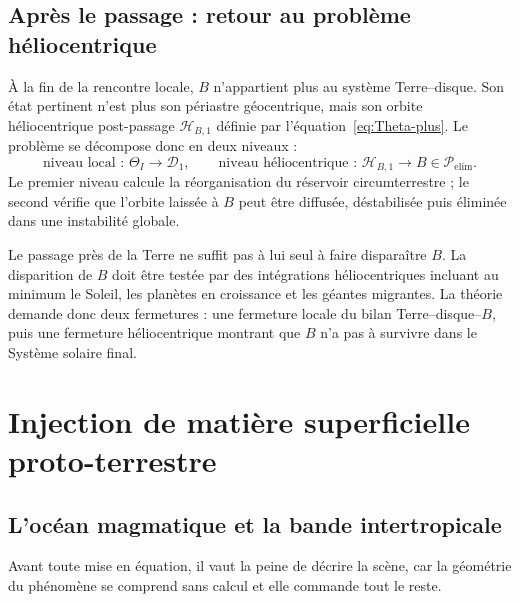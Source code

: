 \documentclass[11pt,a4paper,openany]{report}
\begin{document}
\section{Après le passage : retour au problème héliocentrique}
\label{sec:retour-heliocentrique}

À la fin de la rencontre locale, $B$ n'appartient plus au système Terre--disque. Son état pertinent
n'est plus son périastre géocentrique, mais son orbite héliocentrique post-passage
$\mathcal{H}_{B,1}$ définie par l'équation~\eqref{eq:Theta-plus}. Le problème se décompose donc en
deux niveaux :
\begin{equation}
\boxed{\;\text{niveau local : } \Theta_I\to\mathcal{D}_1,
\qquad
\text{niveau héliocentrique : } \mathcal{H}_{B,1}\to B\in\mathcal{P}_{\mathrm{elim}}.\;}
\label{eq:deux-niveaux-B}
\end{equation}
Le premier niveau calcule la réorganisation du réservoir circumterrestre ; le second vérifie que
l'orbite laissée à $B$ peut être diffusée, déstabilisée puis éliminée dans une instabilité globale.

\begin{controle}
Le passage près de la Terre ne suffit pas à lui seul à faire disparaître $B$. La disparition de $B$
doit être testée par des intégrations héliocentriques incluant au minimum le Soleil, les planètes en
croissance et les géantes migrantes. La théorie demande donc deux fermetures : une fermeture
locale du bilan Terre--disque--$B$, puis une fermeture héliocentrique montrant que $B$ n'a pas à
survivre dans le Système solaire final.
\end{controle}


\chapter{Injection de matière superficielle proto-terrestre}
\label{ch:injection}

\section{L'océan magmatique et la bande intertropicale}
\label{sec:bande}

Avant toute mise en équation, il vaut la peine de décrire la scène, car la géométrie du phénomène
se comprend sans calcul et elle commande tout le reste.
\end{document}
